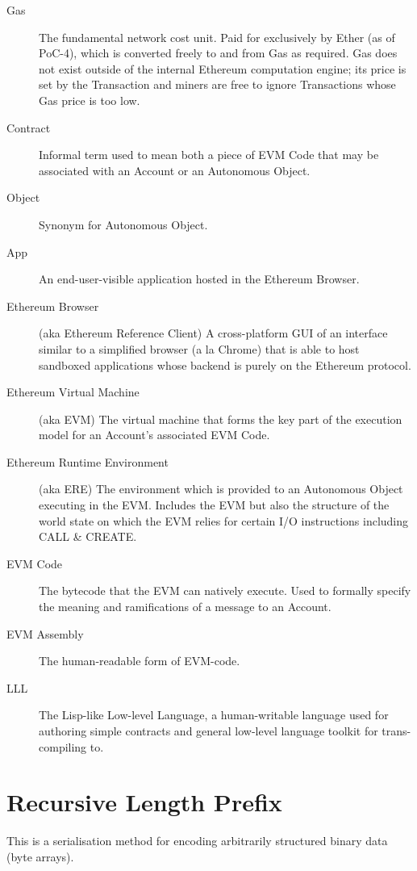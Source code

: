 \documentclass[9pt,oneside]{amsart}
\begin{document}
\begin{description}
\item[Gas] The fundamental network cost unit. Paid for exclusively by Ether (as of PoC-4), which is converted freely to and from Gas as required. Gas does not exist outside of the internal Ethereum computation engine; its price is set by the Transaction and miners are free to ignore Transactions whose Gas price is too low.

\item[Contract] Informal term used to mean both a piece of EVM Code that may be associated with an Account or an Autonomous Object.

\item[Object] Synonym for Autonomous Object.

\item[App] An end-user-visible application hosted in the Ethereum Browser.

\item[Ethereum Browser] (aka Ethereum Reference Client) A cross-platform GUI of an interface similar to a simplified browser (a la Chrome) that is able to host sandboxed applications whose backend is purely on the Ethereum protocol.

\item[Ethereum Virtual Machine] (aka EVM) The virtual machine that forms the key part of the execution model for an Account's associated EVM Code.

\item[Ethereum Runtime Environment] (aka ERE) The environment which is provided to an Autonomous Object executing in the EVM. Includes the EVM but also the structure of the world state on which the EVM relies for certain I/O instructions including CALL \& CREATE.

\item[EVM Code] The bytecode that the EVM can natively execute. Used to formally specify the meaning and ramifications of a message to an Account.

\item[EVM Assembly] The human-readable form of EVM-code.

\item[LLL] The Lisp-like Low-level Language, a human-writable language used for authoring simple contracts and general low-level language toolkit for trans-compiling to.

\end{description}

\section{Recursive Length Prefix}\label{app:rlp}\hypertarget{rlp}{}
This is a serialisation method for encoding arbitrarily structured binary data (byte arrays).
\end{document}
